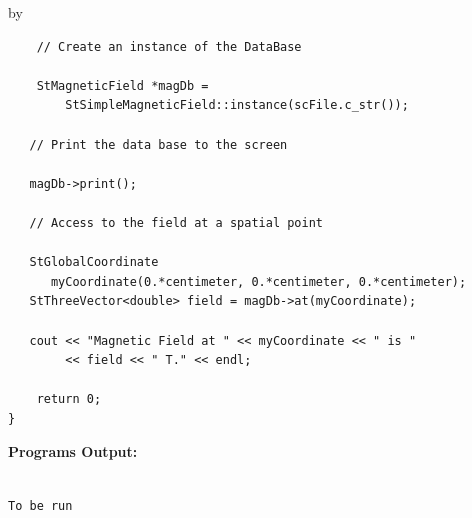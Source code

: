 \documentclass[twoside]{article}
\newcommand{\entrylabel}[1]{\mbox{\textbf{{#1}}}\hfil}%
\newenvironment{entry}
{\begin{list}{}%
    {\renewcommand{\makelabel}{\entrylabel}%
     \setlength{\labelwidth}{90pt}%
     \setlength{\leftmargin}{\labelwidth}
     \advance\leftmargin by \labelsep%
      }%
    }%
  {\end{list}}
\newcommand{\Entrylabel}[1]%
{\raisebox{0pt}[1ex][0pt]{\makebox[\labelwidth][l]%
    {\parbox[t]{\labelwidth}{\hspace{0pt}\textbf{{#1}}}}}}
\newenvironment{Entry}%
{\renewcommand{\entrylabel}{\Entrylabel}\begin{entry}}%
  {\end{entry}}
\begin{document}
\begin{Entry}
{\begin{verbatim}
    // Create an instance of the DataBase

    StMagneticField *magDb =
        StSimpleMagneticField::instance(scFile.c_str());

   // Print the data base to the screen
  
   magDb->print();

   // Access to the field at a spatial point

   StGlobalCoordinate 
      myCoordinate(0.*centimeter, 0.*centimeter, 0.*centimeter);
   StThreeVector<double> field = magDb->at(myCoordinate);
  
   cout << "Magnetic Field at " << myCoordinate << " is " 
        << field << " T." << endl;
    
    return 0;
}
\end{verbatim}
}%
{\bf Programs Output:}
{\footnotesize
\begin{verbatim}

To be run

\end{verbatim}
} %

\end{Entry}
\clearpage


%
%
\end{document}
